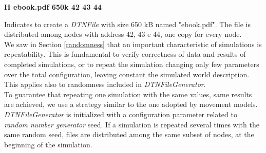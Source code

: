 \begin{center}
\textbf{H	ebook.pdf	650k	42	43	44}
\end{center}
Indicates to create a \textit{DTNFile} with size 650 kB named "ebook.pdf". The file is distributed among nodes with address 42, 43 e 44, one copy for every node.
\\

We saw in Section \ref{randomness} that an important characteristic of simulations is repeatability. This is fundamental to verify correctness of data and results of completed simulations, or to repeat the simulation changing only few parameters over the total configuration, leaving constant the simulated world description. This applies also to randomness included in \textit{DTNFileGenerator}.\\
To guarantee that repeating one simulation with the same values, same results are achieved, we use a strategy similar to the one adopted by movement models. \textit{DTNFileGenerator} is initialized with a configuration parameter related to \textit{random number generator} seed. If a simulation is repeated several times with the same random seed, files are distributed among the same subset of nodes, at the beginning of the simulation.




